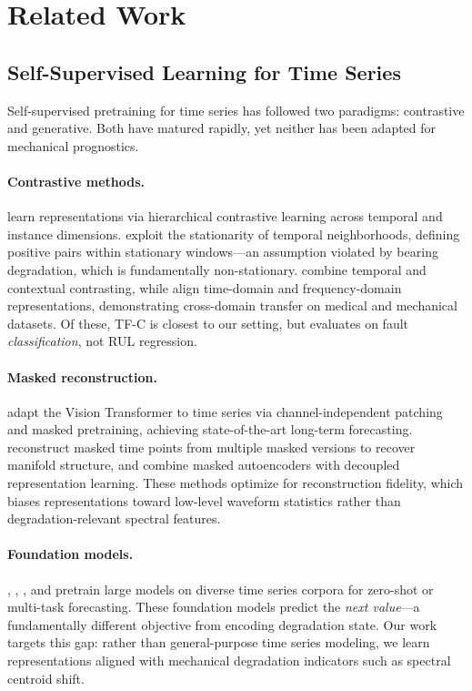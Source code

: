 \section{Related Work}
\label{sec:related}

\subsection{Self-Supervised Learning for Time Series}
\label{sec:related_ssl}

Self-supervised pretraining for time series has followed two paradigms: contrastive and generative. Both have matured rapidly, yet neither has been adapted for mechanical prognostics.

\paragraph{Contrastive methods.} \citet{yue2022ts2vec} learn representations via hierarchical contrastive learning across temporal and instance dimensions. \citet{tonekaboni2021tnc} exploit the stationarity of temporal neighborhoods, defining positive pairs within stationary windows---an assumption violated by bearing degradation, which is fundamentally non-stationary. \citet{eldele2021tstcc} combine temporal and contextual contrasting, while \citet{zhang2022tfc} align time-domain and frequency-domain representations, demonstrating cross-domain transfer on medical and mechanical datasets. Of these, TF-C is closest to our setting, but evaluates on fault \emph{classification}, not RUL regression.

\paragraph{Masked reconstruction.} \citet{nie2023patchtst} adapt the Vision Transformer to time series via channel-independent patching and masked pretraining, achieving state-of-the-art long-term forecasting. \citet{dong2023simmtm} reconstruct masked time points from multiple masked versions to recover manifold structure, and \citet{cheng2023timemae} combine masked autoencoders with decoupled representation learning. These methods optimize for reconstruction fidelity, which biases representations toward low-level waveform statistics rather than degradation-relevant spectral features.

\paragraph{Foundation models.} \citet{das2024timesfm}, \citet{ansari2024chronos}, \citet{goswami2024moment}, and \citet{gao2024units} pretrain large models on diverse time series corpora for zero-shot or multi-task forecasting. These foundation models predict the \emph{next value}---a fundamentally different objective from encoding degradation state. Our work targets this gap: rather than general-purpose time series modeling, we learn representations aligned with mechanical degradation indicators such as spectral centroid shift.

